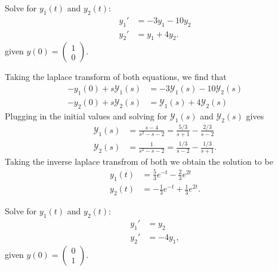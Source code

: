 \begin{example}
    Solve for $y_1(t)$ and $y_2(t)$:
    \begin{align*}
        y_1' &= -3y_1-10y_2 \\
        y_2' &= y_1+4y_2.
    \end{align*}
    given $y(0) = \begin{pmatrix} 1 \\ 0 \end{pmatrix}$.
\end{example}

\begin{soln}
    Taking the laplace transform of both equations, we find that
    \begin{align*}
        -y_1(0) + s\mathcal{Y}_1(s) &= -3\mathcal{Y}_1(s)-10\mathcal{Y}_2(s) \\
        -y_2(0) + s\mathcal{Y}_2(s) &= \mathcal{Y}_1(s)+4\mathcal{Y}_2(s)
    \end{align*}
    Plugging in the initial values and solving for $\mathcal{Y}_1(s)$ and
    $\mathcal{Y}_2(s)$ gives
    \begin{align*}
        \mathcal{Y}_1(s) &= \frac{s-4}{s^2-s-2} = \frac{5/3}{s+1}-\frac{2/3}{s-2}\\
        \mathcal{Y}_2(s) &= \frac{1}{s^2-s-2} = \frac{1/3}{s-2}-\frac{1/3}{s+1}.
    \end{align*}
    Taking the inverse laplace transfrom of both we obtain the solution to be
    \begin{align*}
        y_1(t) &= \frac{5}{3}e^{-t}-\frac{2}{3}e^{2t} \\
        y_2(t) &= -\frac{1}{3}e^{-t} + \frac{1}{3}e^{2t}.
    \end{align*}
\end{soln}

\begin{example}
    Solve for $y_1(t)$ and $y_2(t)$:
    \begin{align*}
        y_1' &= y_2 \\
        y_2' &= -4y_1,
    \end{align*}
    given $y(0) = \begin{pmatrix} 0 \\ 1 \end{pmatrix}$.
\end{example}

